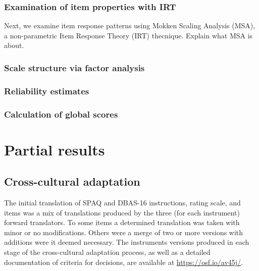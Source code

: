 \documentclass[
  ,doc,11pt, twoside,floatsintext]{apa6}
\begin{document}
\hypertarget{examination-of-item-properties-with-irt}{%
\subsubsection{Examination of item properties with IRT}\label{examination-of-item-properties-with-irt}}

Next, we examine item response patterns using Mokken Scaling Analysis (MSA), a non-parametric Item Response Theory (IRT) thecnique. Explain what MSA is about.

\hypertarget{scale-structure-via-factor-analysis}{%
\subsubsection{Scale structure via factor analysis}\label{scale-structure-via-factor-analysis}}

\hypertarget{reliability-estimates}{%
\subsubsection{Reliability estimates}\label{reliability-estimates}}

\hypertarget{calculation-of-global-scores}{%
\subsubsection{Calculation of global scores}\label{calculation-of-global-scores}}

\newpage

\hypertarget{partial-results}{%
\section{Partial results}\label{partial-results}}

\hypertarget{cross-cultural-adaptation}{%
\subsection{Cross-cultural adaptation}\label{cross-cultural-adaptation}}

The initial translation of SPAQ and DBAS-16 instructions, rating scale, and items was a mix of translations produced by the three (for each instrument) forward translators. To some items a determined translation was taken with minor or no modifications. Others were a merge of two or more versions with additions were it deemed necessary. The instruments versions produced in each stage of the cross-cultural adaptation process, as well as a detailed documentation of criteria for decisions, are available at \url{https://osf.io/av45j/}.
\end{document}
